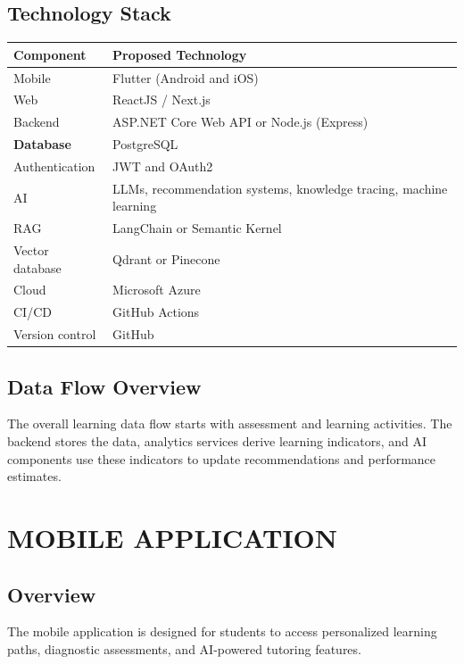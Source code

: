 \documentclass[12pt,a4paper]{report}
\begin{document}
\section{Technology Stack}

\begin{longtable}{p{}p{}}
\toprule
\textbf{Component} & \textbf{Proposed Technology}\\
\midrule
Mobile & Flutter (Android and iOS)\\
Web & ReactJS / Next.js\\
Backend & ASP.NET Core Web API or Node.js (Express)\\
\textbf{Database }& PostgreSQL\\
Authentication & JWT and OAuth2\\
AI & LLMs, recommendation systems, knowledge tracing, machine learning\\
RAG & LangChain or Semantic Kernel\\
Vector database & Qdrant or Pinecone\\
Cloud & Microsoft Azure\\
CI/CD & GitHub Actions\\
Version control & GitHub\\
\bottomrule
\end{longtable}

\section{Data Flow Overview}

The overall learning data flow starts with assessment and learning activities. The backend stores the data, analytics services derive learning indicators, and AI components use these indicators to update recommendations and performance estimates.

\chapter{MOBILE APPLICATION}

\section{Overview}

The mobile application is designed for students to access
personalized learning paths, diagnostic assessments, and
AI-powered tutoring features.
\end{document}
